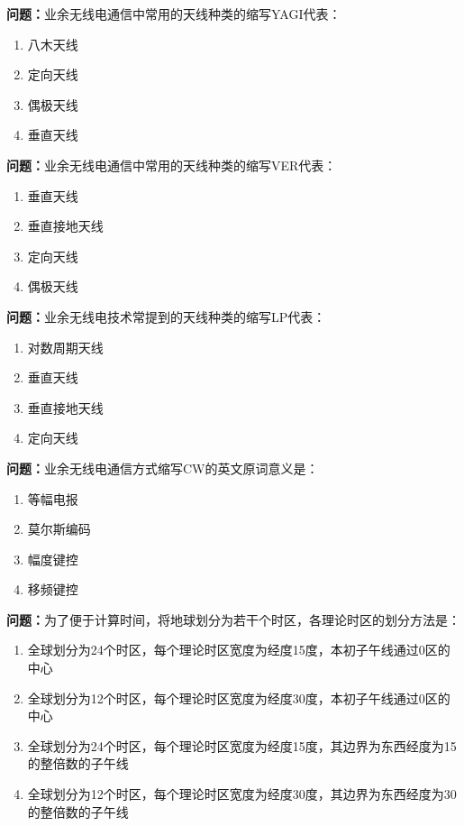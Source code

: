 \bigskip


\noindent\textbf{问题：}业余无线电通信中常用的天线种类的缩写YAGI代表：
\begin{enumerate}[label=\Alph*), leftmargin=3em]
\item 八木天线
\item 定向天线
\item 偶极天线
\item 垂直天线
\end{enumerate}

\bigskip


\noindent\textbf{问题：}业余无线电通信中常用的天线种类的缩写VER代表：
\begin{enumerate}[label=\Alph*), leftmargin=3em]
\item 垂直天线
\item 垂直接地天线
\item 定向天线
\item 偶极天线
\end{enumerate}

\bigskip


\noindent\textbf{问题：}业余无线电技术常提到的天线种类的缩写LP代表：
\begin{enumerate}[label=\Alph*), leftmargin=3em]
\item 对数周期天线
\item 垂直天线
\item 垂直接地天线
\item 定向天线
\end{enumerate}

\bigskip


\noindent\textbf{问题：}业余无线电通信方式缩写CW的英文原词意义是：
\begin{enumerate}[label=\Alph*), leftmargin=3em]
\item 等幅电报
\item 莫尔斯编码
\item 幅度键控
\item 移频键控
\end{enumerate}

\bigskip


\noindent\textbf{问题：}为了便于计算时间，将地球划分为若干个时区，各理论时区的划分方法是：
\begin{enumerate}[label=\Alph*), leftmargin=3em]
\item 全球划分为24个时区，每个理论时区宽度为经度15度，本初子午线通过0区的中心
\item 全球划分为12个时区，每个理论时区宽度为经度30度，本初子午线通过0区的中心
\item 全球划分为24个时区，每个理论时区宽度为经度15度，其边界为东西经度为15的整倍数的子午线
\item 全球划分为12个时区，每个理论时区宽度为经度30度，其边界为东西经度为30的整倍数的子午线
\end{enumerate}

